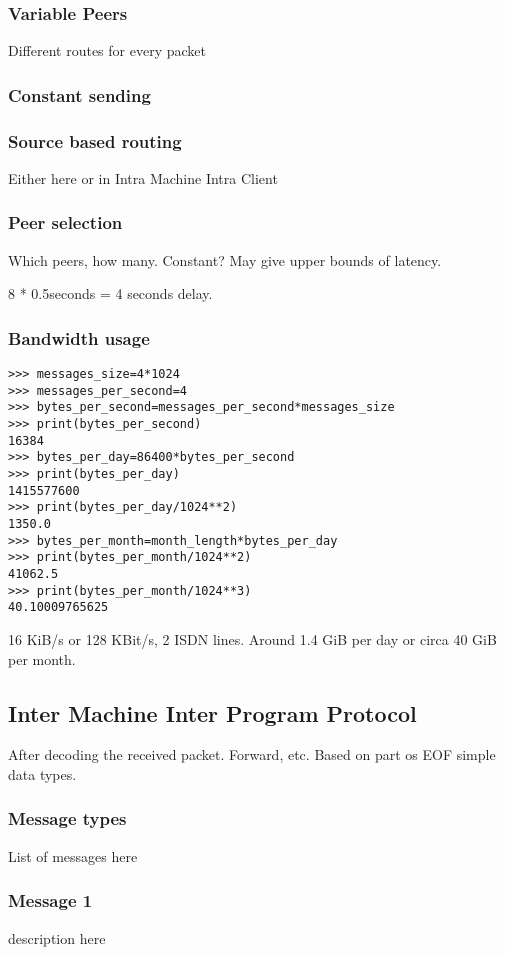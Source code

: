 \subsubsection{Variable Peers}
Different routes for every packet
\subsubsection{Constant sending}

\subsubsection{Source based routing}
Either here or in Intra Machine Intra Client
\subsubsection{Peer selection}
Which peers, how many. Constant? May give upper bounds of latency.

8 * 0.5seconds = 4 seconds delay.

\subsubsection{Bandwidth usage}
\begin{verbatim}
>>> messages_size=4*1024
>>> messages_per_second=4
>>> bytes_per_second=messages_per_second*messages_size
>>> print(bytes_per_second)
16384
>>> bytes_per_day=86400*bytes_per_second
>>> print(bytes_per_day)
1415577600
>>> print(bytes_per_day/1024**2)
1350.0
>>> bytes_per_month=month_length*bytes_per_day
>>> print(bytes_per_month/1024**2)
41062.5
>>> print(bytes_per_month/1024**3)
40.10009765625
\end{verbatim}
16 KiB/s or 128 KBit/s, 2 ISDN lines. Around 1.4 GiB per day or
circa 40 GiB per month.

\subsection{Inter Machine Inter Program Protocol}
After decoding the received packet. Forward, etc.
Based on part os EOF simple data types.
\subsubsection{Message types}
List of messages here
\subsubsection{Message 1}
description here

